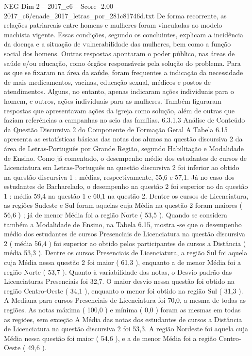 \begin{textsample}{NEG Dim 2 – 2017\_c6 – Score -2.00 – 2017\_c6/enade\_2017\_letras\_por\_281c81746d.txt}
De forma recorrente, as relações patriarcais entre homens e mulheres foram vinculadas ao modelo machista vigente.
Essas condições, segundo os concluintes, explicam a incidência da doença e a situação de vulnerabilidade das mulheres, bem como a função social dos homens.
Outras respostas apontaram o poder público, nas áreas de saúde e/ou educação, como órgãos responsáveis pela solução do problema.
Para os que se fixaram na área da saúde, foram frequentes a indicação da necessidade de mais medicamentos, vacinas, educação sexual, médicos e postos de atendimentos.
Alguns, no entanto, apenas indicaram ações individuais para o homem, e outros, ações individuais para as mulheres.
Também figuraram respostas que apresentavam ações da igreja como solução, além de outras que faziam referências a campanhas no seio das famílias. 6.3.1.3 Análise de Conteúdo da Questão Discursiva 2 do Componente de Formação Geral A Tabela 6.15 apresenta as estatísticas básicas das notas dos alunos na questão discursiva 2 da área de Letras-Português por Grande Região, segundo Habilitação e Modalidade de Ensino.
Como já comentado, o desempenho médio dos estudantes de cursos de Licenciatura em Letras-Português na questão discursiva 2 foi inferior ao obtido na questão discursiva 1 : médias, respectivamente, 55,6 e 57,1.
Já no caso dos estudantes de Bacharelado, o desempenho na questão 2 foi superior ao da questão 1 : média 59,4 na questão 1 e 60,1 na questão 2.
Dentre os cursos de Licenciatura, as regiões Sudeste e Sul foram aquelas cuja Média na questão 2 foram maiores ( 56,6 ) ; já de menor Média foi a região Norte ( 53,5 ).
Quando se considera também a Modalidade de Ensino, na Tabela 6.15, mostra -se que o desempenho médio dos estudantes de cursos Presenciais de Licenciatura na questão discursiva 2 ( média 56,4 ) foi superior ao obtido pelos participantes de cursos a Distância ( média 53,3 ).
Dentre os cursos Presenciais de Licenciatura, a região Sul foi aquela cuja Média nessa questão 2 foi maior ( 61,3 ), enquanto a de menor Média foi a região Norte ( 53,7 ).
Quanto à variabilidade das notas, o Desvio padrão das Licenciaturas Presenciais foi 32,7.
O maior desvio nessa questão foi obtido na região Centro-Oeste ( 34,1 ), enquanto o menor foi obtido na região Sul ( 31,3 ).
A Mediana para cursos Presenciais de Licenciatura foi 70,0, a mesma de todas as regiões.
As notas máxima ( 100,0 ) e mínima ( 0,0 ) foram as mesmas em todas as regiões, sem exceção A Média das notas dos estudantes de cursos a Distância de Licenciatura na questão discursiva 2 foi 53,3.
A região Nordeste foi aquela cuja Média nessa questão foi maior ( 54,6 ), e a de menor Média foi a região Centro-Oeste ( 49,6 ).

\end{textsample}

